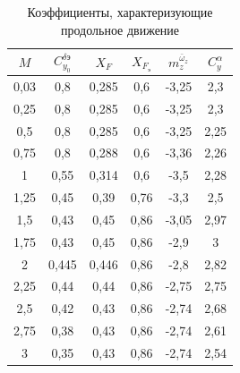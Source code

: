 \begin{table}[H]
    \centering
    \caption{Коэффициенты, характеризующие продольное движение}
    \label{tab:Коэффициенты, характеризующие продольное движение}
    \begin{tabular}{|c||c|c|c|c|c|}
    \hline
        $M$ & $C_{y_0}^{\delta \text{э}}$ &$X_F$ & $X_{F_{\text{э}}}$ &$m_z^{\bar{\omega}_z}$ & $C_y^{\alpha}$ \\ \hline \hline
        0,03  & 0,8  & 0,285  & 0,6  & -3,25 & 2,3 \\ \hline
        0,25  & 0,8  & 0,285  & 0,6  & -3,25 &2,3 \\ \hline
        0,5  & 0,8  & 0,285  & 0,6  & -3,25 & 2,25\\ \hline
        0,75  & 0,8  & 0,288  & 0,6  & -3,36 & 2,26\\ \hline
        1  & 0,55  & 0,314  & 0,6  & -3,5 &2,28 \\ \hline
        1,25  & 0,45  & 0,39  & 0,76  & -3,3 &2,5 \\ \hline
        1,5  & 0,43  & 0,45  & 0,86  & -3,05 &2,97 \\ \hline
        1,75  & 0,43  & 0,45  & 0,86  & -2,9 & 3\\ \hline
        2  & 0,445  & 0,446  & 0,86  & -2,8 & 2,82\\ \hline
        2,25  & 0,44  & 0,44  & 0,86  & -2,75 & 2,75\\ \hline
        2,5  & 0,42  & 0,43  & 0,86  & -2,74 & 2,68\\ \hline
        2,75  & 0,38  & 0,43  & 0,86  & -2,74 & 2,61\\ \hline
        3  & 0,35  & 0,43  & 0,86  & -2,74 & 2,54\\ \hline
    \end{tabular}
\end{table}

